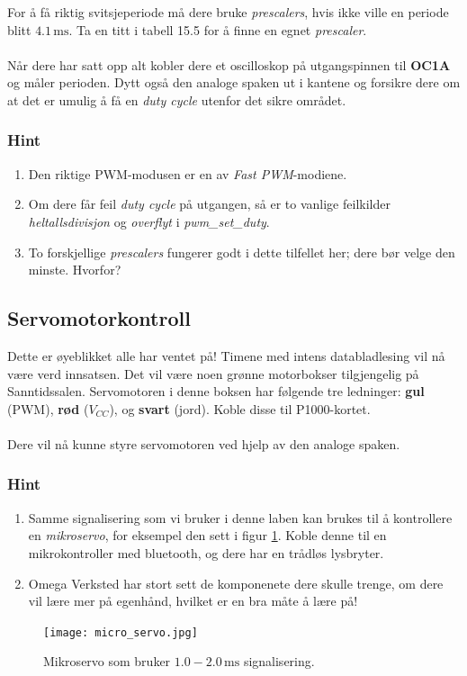 \documentclass[11pt,a4paper]{article}
\begin{document}
For å få riktig svitsjeperiode må dere bruke \textit{prescalers}, hvis ikke ville en periode blitt $4.1\,\mathrm{ms}$. Ta en titt i tabell 15.5 for å finne en egnet \textit{prescaler}.\\
\\
Når dere har satt opp alt kobler dere et oscilloskop på utgangspinnen til \textbf{OC1A} og måler perioden. Dytt også den analoge spaken ut i kantene og forsikre dere om at det er umulig å få en \textit{duty cycle} utenfor det sikre området.
\subsubsection{Hint}
\begin{enumerate}
\item Den riktige PWM-modusen er en av \textit{Fast PWM}-modiene.
\item Om dere får feil \textit{duty cycle} på utgangen, så er to vanlige feilkilder \textit{heltallsdivisjon} og \textit{overflyt} i \textit{pwm\_set\_duty}.
\item To forskjellige \textit{prescalers} fungerer godt i dette tilfellet her; dere bør velge den minste. Hvorfor?
\end{enumerate}
\subsection{Servomotorkontroll}
Dette er øyeblikket alle har ventet på! Timene med intens databladlesing vil nå være verd innsatsen. Det vil være noen grønne motorbokser tilgjengelig på Sanntidssalen. Servomotoren i denne boksen har følgende tre ledninger: \textbf{gul} (PWM), \textbf{rød} ($V_{CC}$), og \textbf{svart} (jord). Koble disse til P1000-kortet.\\
\\
Dere vil nå kunne styre servomotoren ved hjelp av den analoge spaken.
\subsubsection{Hint}
\begin{enumerate}
\item Samme signalisering som vi bruker i denne laben kan brukes til å kontrollere en \textit{mikroservo}, for eksempel den sett i figur \ref{Micro::servo}. Koble denne til en mikrokontroller med bluetooth, og dere har en trådløs lysbryter.
\item Omega Verksted har stort sett de komponenete dere skulle trenge, om dere vil lære mer på egenhånd, hvilket er en bra måte å lære på!
\end{enumerate}
\begin{figure}[!h]
\centering
\texttt{[image: micro\_servo.jpg]}
\caption{Mikroservo som bruker $1.0 - 2.0\,\mathrm{ms}$ signalisering.}
\label{Micro::servo}
\end{figure}
\end{document}

